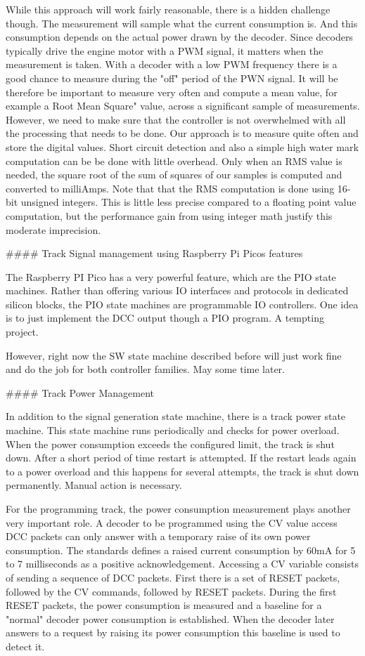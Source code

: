 While this approach will work fairly reasonable, there is a hidden challenge though. The measurement will sample what the current consumption is. And this consumption depends on the actual power drawn by the decoder. Since decoders typically drive the engine motor with a PWM signal, it matters when the measurement is taken. With a decoder with a low PWM frequency there is a good chance to measure during the "off" period of the PWN signal. It will be therefore be important to measure very often and compute a mean value, for example a Root Mean Square" value, across a significant sample of measurements. However, we need to make sure that the controller is not overwhelmed with all the processing that needs to be done. Our approach is to measure quite often and store the digital values. Short circuit detection and also a simple high water mark computation can be be done with little overhead. Only when an RMS value is needed, the square root of the sum of squares of our samples is computed and converted to milliAmps. Note that that the RMS computation is done using 16-bit unsigned integers. This is little less precise compared to a floating point value computation, but the performance gain from using integer math justify this moderate imprecision.

#### Track Signal management using Raspberry Pi Picos features

The Raspberry PI Pico has a very powerful feature, which are the PIO state machines. Rather than offering various IO interfaces and protocols in dedicated silicon blocks, the PIO state  machines are programmable IO controllers. One idea is to just implement the DCC output though a PIO program. A tempting project.

However, right now the SW state machine described before will just work fine and do the job for both controller families. May some time later.

#### Track Power Management

In addition to the signal generation state machine, there is a track power state machine. This state machine runs periodically and checks for power overload. When the power consumption exceeds the configured limit, the track is shut down. After a short period of time restart is attempted. If the restart leads again to a power overload and this happens for several attempts, the track is shut down permanently. Manual action is necessary.

For the programming track, the power consumption measurement plays another very important role. A decoder to be programmed using the CV value access DCC packets can only answer with a temporary raise of its own power consumption. The standards defines a raised current consumption by 60mA for 5 to 7 milliseconds as a positive acknowledgement. Accessing a CV variable consists of sending a sequence of DCC packets. First there is a set of RESET packets, followed by the CV commands, followed by RESET packets. During the first RESET packets, the power consumption is measured and a baseline for a "normal" decoder power consumption is established. When the decoder later answers to a request by raising its power consumption this baseline is used to detect it.

